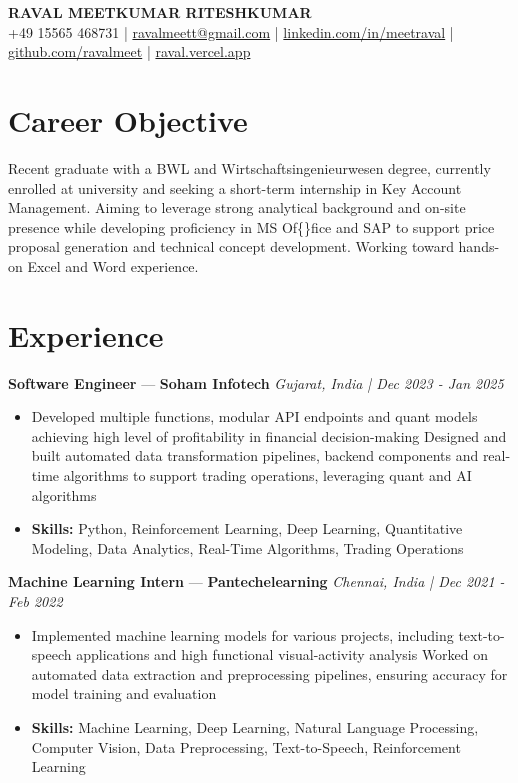 \documentclass[a4paper,10pt]{article}
\begin{document}
\begin{center}
  {\Large\bfseries RAVAL MEETKUMAR RITESHKUMAR}\\[2pt]
  {\small +49 15565 468731 \;|\; \href{mailto:ravalmeett@gmail.com}{ravalmeett@gmail.com} \;|\; \href{https://www.linkedin.com/in/meetraval/}{linkedin.com/in/meetraval} \;|\; \href{https://github.com/ravalmeet}{github.com/ravalmeet} \;|\; \href{https://raval.vercel.app/}{raval.vercel.app}}
\end{center}
\vspace{-3pt}

\section*{Career Objective}
Recent graduate with a BWL and Wirtschaftsingenieurwesen degree, currently enrolled at university and seeking a short-term internship in Key Account Management. Aiming to leverage strong analytical background and on-site presence while developing proficiency in MS Of\{\}fice and SAP to support price proposal generation and technical concept development. Working toward hands-on Excel and Word experience.\par

\section*{Experience}
\textbf{Software Engineer} — \textbf{Soham Infotech} \hfill \textit{Gujarat, India \;|\; Dec 2023 - Jan 2025}\par
\vspace{1pt}
\begin{itemize}
  \item Developed multiple functions, modular API endpoints and quant models achieving high level of profitability in financial decision-making Designed and built automated data transformation pipelines, backend components and real-time algorithms to support trading operations, leveraging quant and AI algorithms
  \item \textbf{Skills:} Python, Reinforcement Learning, Deep Learning, Quantitative Modeling, Data Analytics, Real-Time Algorithms, Trading Operations
\end{itemize}
\vspace{3pt}
\textbf{Machine Learning Intern} — \textbf{Pantechelearning} \hfill \textit{Chennai, India \;|\; Dec 2021 - Feb 2022}\par
\vspace{1pt}
\begin{itemize}
  \item Implemented machine learning models for various projects, including text-to-speech applications and high functional visual-activity analysis Worked on automated data extraction and preprocessing pipelines, ensuring accuracy for model training and evaluation
  \item \textbf{Skills:} Machine Learning, Deep Learning, Natural Language Processing, Computer Vision, Data Preprocessing, Text-to-Speech, Reinforcement Learning
\end{itemize}
\end{document}
